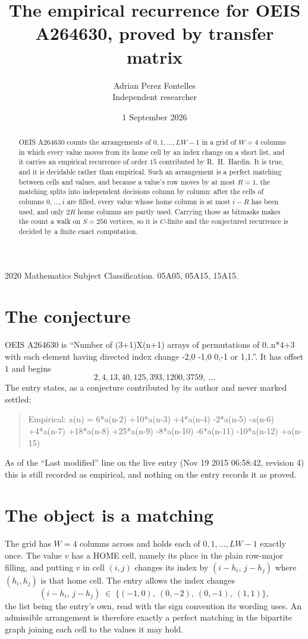 \documentclass[11pt,a4paper]{article}
\title{The empirical recurrence for OEIS A264630, proved by transfer matrix}
\author{Adrian Perez Fontelles\\ \small Independent researcher}
\date{1 September 2026}
\theoremstyle{plain}
\theoremstyle{definition}
\begin{document}
\maketitle

\begin{abstract}
OEIS A264630 counts the arrangements of $0,1,\dots,LW-1$ in a grid of $W=4$ columns in which
every value moves from its home cell by an index change on a short list, and it carries an
empirical recurrence of order $15$ contributed by R.~H.~Hardin. It is true, and it is
decidable rather than empirical. Such an arrangement is a perfect matching between cells and
values, and because a value's row moves by at most $R=1$, the matching splits into
independent decisions column by column: after the cells of columns $0,\dots,i$ are filled,
every value whose home column is at most $i-R$ has been used, and only $2R$ home columns are
partly used. Carrying those as bitmasks makes the count a walk on $S=256$ vertices, so it is
$C$-finite and the conjectured recurrence is decided by a finite exact computation.
\end{abstract}

\noindent\small 2020 Mathematics Subject Classification. 05A05, 05A15, 15A15.\normalsize

\section{The conjecture}

OEIS A264630 is ``Number of (3+1)X(n+1) arrays of permutations of 0..n*4+3 with each element having directed index change -2,0 -1,0 0,-1 or 1,1.''. It has offset $1$ and begins
\[
2, 4, 13, 40, 125, 393, 1200, 3759,\ \dots
\]
The entry states, as a conjecture contributed by its author and never marked settled:
\begin{quote}
Empirical: a(n) = 6*a(n-2) +10*a(n-3) +4*a(n-4) -2*a(n-5) -a(n-6) +4*a(n-7) +18*a(n-8) +25*a(n-9) -8*a(n-10) -6*a(n-11) -10*a(n-12) +a(n-15)
\end{quote}
As of the ``Last modified'' line on the live entry (Nov 19 2015 06:58:42, revision 4) this is still
recorded as empirical, and nothing on the entry records it as proved.

\section{The object is a matching}

The grid has $W=4$ columns across and holds each of $0,1,\dots,LW-1$ exactly once. The value
$v$ has a HOME cell, namely its place in the plain row-major filling, and putting $v$ in cell
$(i,j)$ changes its index by $(i-h_i,\,j-h_j)$ where $(h_i,h_j)$ is that home cell. The entry
allows the index changes
\[
(i-h_i,\,j-h_j)\;\in\;\{(-1,0),\ (0,-2),\ (0,-1),\ (1,1)\},
\]
the list being the entry's own, read with the sign convention its wording uses. An admissible
arrangement is therefore exactly a perfect matching in the bipartite graph joining each cell to
the values it may hold.
\end{document}

